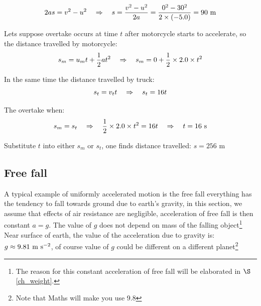 \begin{soln}
\begin{equation*}
2as=v^2-u^2 \quad \Rightarrow \quad s = \frac{v^2-u^2}{2a} = \frac{0^2 - 30^2}{2\times(-5.0)} = 90 \text{ m} 
\end{equation*}
\end{soln}


\begin{soln} Lets suppose overtake occurs at time $t$ after motorcycle starts to accelerate, so the distance travelled by motorcycle: $$s_m = u_mt + \frac{1}{2}at^2  \quad \Rightarrow \quad s_m = 0 + \frac{1}{2}\times 2.0 \times t^2$$

In the same time the distance travelled by truck: $$s_t = v_t t \quad \Rightarrow \quad s_t = 16t$$

The overtake when: $$s_m = s_t \quad \Rightarrow \quad \frac{1}{2}\times 2.0 \times t^2 = 16 t \quad \Rightarrow \quad t=16 \text{ s}$$

Substitute $t$ into either $s_m$ or $s_t$, one finds distance travelled: $s = 256 \text{ m}$ 
\end{soln}




\subsection{Free fall}\label{ch_freefall}

A typical example of uniformly accelerated motion is the free fall everything has the tendency to fall towards ground due to earth's gravity, in this section, we assume that effects of air resistance are negligible, acceleration of free fall is then constant $a=g$. The value of $g$ does not depend on mass of the falling object\footnote{The reason for this constant acceleration of free fall will be elaborated in $\S$\ref{ch_weight}.} Near surface of earth, the value of the acceleration due to gravity is: $g\approx9.81\text{ m s$^{-2}$}$, of course value of $g$ could be different on a different planet\footnote[][]{Note that Maths will make you use 9.8\mpss}

